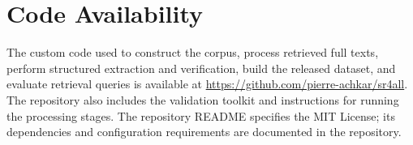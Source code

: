 \section*{Code Availability}

The custom code used to construct the corpus, process retrieved full texts, perform structured extraction and verification, build the released dataset, and evaluate retrieval queries is available at \href{https://github.com/pierre-achkar/sr4all}{https://github.com/pierre-achkar/sr4all}. The repository also includes the validation toolkit and instructions for running the processing stages. The repository README specifies the MIT License; its dependencies and configuration requirements are documented in the repository.
